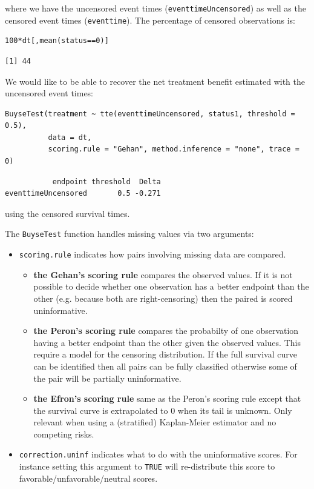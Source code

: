 \documentclass[12pt]{article}
\begin{document}
where we have the uncensored event times (\texttt{eventtimeUncensored}) as well as the censored event
times (\texttt{eventtime}). The percentage of censored observations is:
\lstset{language=r,label= ,caption= ,captionpos=b,numbers=none}
\begin{lstlisting}
100*dt[,mean(status==0)]
\end{lstlisting}

\begin{verbatim}
[1] 44
\end{verbatim}


We would like to be able to recover the net treatment benefit estimated with the uncensored event times:
\lstset{language=r,label= ,caption= ,captionpos=b,numbers=none}
\begin{lstlisting}
BuyseTest(treatment ~ tte(eventtimeUncensored, status1, threshold = 0.5),
          data = dt,
          scoring.rule = "Gehan", method.inference = "none", trace = 0)
\end{lstlisting}

\begin{verbatim}
           endpoint threshold  Delta
eventtimeUncensored       0.5 -0.271
\end{verbatim}


using the censored survival times.

\clearpage

The \texttt{BuyseTest} function handles missing values via two arguments:
\begin{itemize}
\item \texttt{scoring.rule} indicates how pairs involving missing data are compared. 
\begin{itemize}
\item \textbf{the Gehan's scoring rule} compares the observed values. If it is
not possible to decide whether one observation has a better
endpoint than the other (e.g. because both are right-censoring)
then the paired is scored uninformative.
\item \textbf{the Peron's scoring rule} compares the probabilty of one
observation having a better endpoint than the other given the
observed values. This require a model for the censoring
distribution. If the full survival curve can be identified then
all pairs can be fully classified otherwise some of the pair
will be partially uninformative.
\item \textbf{the Efron's scoring rule} same as the Peron's scoring rule
except that the survival curve is extrapolated to 0 when its
tail is unknown. Only relevant when using a (stratified)
Kaplan-Meier estimator and no competing risks.
\end{itemize}
\item \texttt{correction.uninf} indicates what to do with the uninformative
scores. For instance setting this argument to \texttt{TRUE} will
re-distribute this score to favorable/unfavorable/neutral scores.
\end{itemize}
\end{document}
